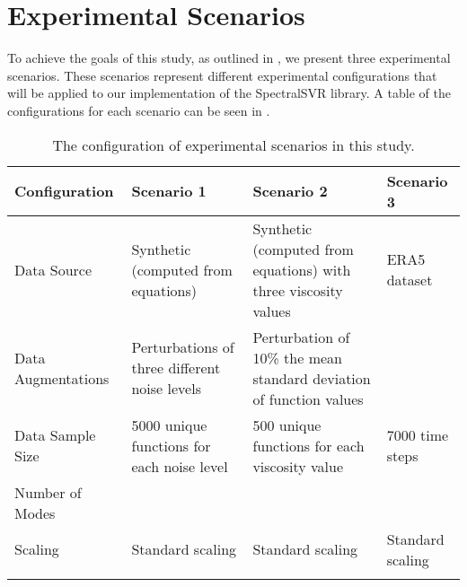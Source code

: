 \section{Experimental Scenarios}\label{sec:experimental_scenarios}
\noindent To achieve the goals of this study, as outlined in , we present three experimental scenarios. These scenarios represent different experimental configurations that will be applied to our implementation of the SpectralSVR library. A table of the configurations for each scenario can be seen in .

\begin{table}[H]
  \caption{The configuration of experimental scenarios in this study.}\label{table:experimental_scenarios}
  \centering
  \begin{tabularx}{\textwidth}{L{0.75}*{3}{L{1.09}}} %
    \toprule
    Configuration                    & Scenario 1                                          & Scenario 2                                                                                            & Scenario 3                                   \\
    \midrule
    Data Source                      & Synthetic (computed from equations)                 & Synthetic (computed from equations) with three viscosity values                                       & ERA5 dataset                                 \\\addlinespace[0.5em]
    Data Augmentations               & Perturbations of three different noise levels       & Perturbation of 10\% the mean standard deviation of function values                                   &                                              \\\addlinespace[0.5em]
    Data Sample Size                 & 5000 unique functions for each noise level          & 500 unique functions for each viscosity value                                                         & 7000 time steps                              \\\addlinespace[0.5em]
    Number of Modes                  &                                                     &                                                                                                       &                                              \\\addlinespace[0.5em]
    Scaling                          & Standard scaling                                    & Standard scaling                                                                                      & Standard scaling                             \\\addlinespace[0.5em]

\end{tabularx}
\end{table}
